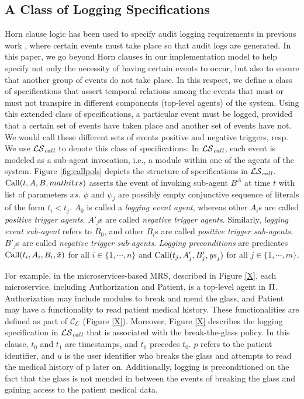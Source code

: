 \subsection{A Class of Logging Specifications} \label{sec:logspec}
Horn clause logic has been used to specify audit logging requirements in previous work \cite{X}, where certain events must take place so that audit logs are generated. In this paper, we go beyond Horn clauses in our implementation model to help specify not only the necessity of having certain events to occur, but also to ensure that another group of events do not take place. In this respect, we define a class of specifications that assert temporal relations among the events that must or must not transpire in different components (top-level agents) of the system. Using this extended class of specifications, a particular event must be logged, provided that a certain set of events have taken place and another set of events have not. We would call these different sets of events positive and negative triggers, resp. We use ${\mathcal{LS}_{\mathit{call}}}$ to denote this class of specifications. In ${\mathcal{LS}_{\mathit{call}}}$, each event is modeled as a sub-agent invocation, i.e., a module within one of the agents of the system. Figure \ref{fig:callpols} depicts the structure of specifications in ${\mathcal{LS}_{\mathit{call}}}$. $\mathrm{Call}(t,A,B,mathit{xs})$ asserts the event of invoking sub-agent $B^A$ at time $t$ with list of parameters $\mathit{xs}$. $\phi$ and $\psi_j$ are possibly empty conjunctive sequence of literals of the form $t_i < t_j$. $A_0$ is called a \emph{logging event agent}, whereas other $A_i$s are called \emph{positive trigger agents}. $A'_j$s are called \emph{negative trigger agents}. Similarly, \emph{logging event sub-agent} refers to $B_0$, and other $B_i$s are called \emph{positive trigger sub-agents}. $B'_j$s are called \emph{negative trigger sub-agents}. \emph{Logging preconditions} are predicates $\mathrm{Call}(t_i,A_i,B_i,\tilde{x})$ for all $i \in \{1,\cdots, n\}$ and $\mathrm{Call}(t_j , A'_j , B'_j , \mathit{ys}_j )$ for all $j \in \{1, \cdots, m\}$. 

For example, in the microservices-based MRS, described in Figure \ref{X}, each microservice, including Authorization and Patient, is a top-level agent in $\Pi$. Authorization may include modules to break and mend the glass, and Patient may have a functionality to read patient medical history. These functionalities are defined as part of $\mathcal{C}_\mathcal{L}$ (Figure \ref{X}). Moreover, Figure \ref{X} describes the logging specification in ${\mathcal{LS}_{\mathit{call}}}$ that is associated with the break-the-glass policy. In this clause, $t_0$ and $t_1$ are timestamps, and $t_1$ precedes $t_0$. $p$ refers to the patient identifier, and $u$ is the user identifier who breaks the glass and attempts to read the medical history of p later on. Additionally, logging is preconditioned on the fact that the glass is not mended in between the events of breaking the glass and gaining access to the patient medical data. 


